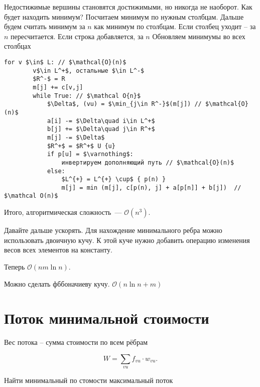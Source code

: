 Недостижимые вершины становятся достижимыми, но никогда не наоборот. Как будет находить минимум?
Посчитаем минимум по нужным столбцам. Дальше будем считать минимум за $n$ как минимум по столбцам.
Если столбец уходит -- за $n$ пересчитается. Если строка добавляется, за $n$ Обновляем минимумы во всех столбцах

\begin{lstlisting}[mathescape=true]
    for v $\in$ L: // $\mathcal{O}(n)$
        v$\in L^+$, остальные $\in L^-$
        $R^-$ = R
        m[j] += c[v,j]
        while True: // $\mathcal O{n}$
            $\Delta$, (vu) = $\min_{j\in R^-}$(m[j]) // $\mathcal{O}(n)$
            a[i] -= $\Delta\quad i\in L^+$
            b[j] += $\Delta\quad j\in R^+$
            m[j] -= $\Delta$
            $R^+$ = $R^+$ U {u}
            if p[u] = $\varnothing$:
                инвертируем дополняющий путь // $\mathcal{O}(n)$
            else:
                $L^{+} = L^{+} \cup$ { p(n) }
                m[j] = min (m[j], c[p(n), j] + a[p[n]] + b[j])  // $\mathcal O(n)$
\end{lstlisting}

Итого, алгоритмическая сложность~--- $\mathcal O(n^3)$.

Давайте дальше ускорять. Для нахождение минимального ребра можно использовать двоичную кучу.
К этой куче нужно добавить операцию изменения весов всех элементов на константу.

Теперь $\mathcal O(nm\ln n)$.

Можно сделать фббоначиеву кучу. $\mathcal O(n\ln n + m)$



\section{Поток минимальной стоимости}


\begin{definition}
    Вес потока -- сумма стоимости по всем рёбрам

    \[
        W = \sum_{vu} f_{vu}\cdot w_{vu}
    .\] 
\end{definition}
\begin{problem}
    Найти минимальный по стомости максимальный поток
\end{problem}

